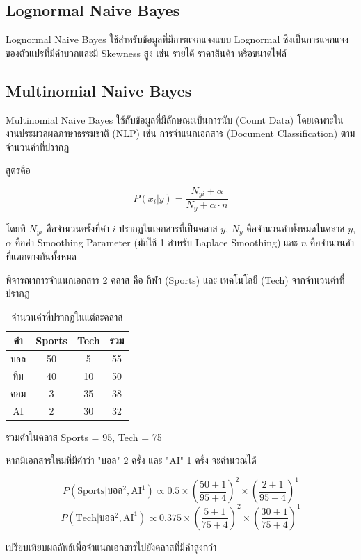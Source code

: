 \subsection{Lognormal Naive Bayes}
Lognormal Naive Bayes ใช้สำหรับข้อมูลที่มีการแจกแจงแบบ Lognormal ซึ่งเป็นการแจกแจงของตัวแปรที่มีค่าบวกและมี Skewness สูง เช่น รายได้ ราคาสินค้า หรือขนาดไฟล์

\subsection{Multinomial Naive Bayes}
Multinomial Naive Bayes ใช้กับข้อมูลที่มีลักษณะเป็นการนับ (Count Data) โดยเฉพาะในงานประมวลผลภาษาธรรมชาติ (NLP) เช่น การจำแนกเอกสาร (Document Classification) ตามจำนวนคำที่ปรากฏ

สูตรคือ

\[
P(x_i | y) = \frac{N_{yi} + \alpha}{N_y + \alpha \cdot n}
\]

โดยที่ $N_{yi}$ คือจำนวนครั้งที่คำ $i$ ปรากฏในเอกสารที่เป็นคลาส $y$, $N_y$ คือจำนวนคำทั้งหมดในคลาส $y$, $\alpha$ คือค่า Smoothing Parameter (มักใช้ 1 สำหรับ Laplace Smoothing) และ $n$ คือจำนวนคำที่แตกต่างกันทั้งหมด

\begin{exmp}
\label{exmp:multinomial_naive_bayes}
พิจารณาการจำแนกเอกสาร 2 คลาส คือ กีฬา (Sports) และ เทคโนโลยี (Tech) จากจำนวนคำที่ปรากฏ

\begin{table}[h!]
\centering
\caption{จำนวนคำที่ปรากฏในแต่ละคลาส}
\label{tab:word_counts}
\begin{tabular}{|c|c|c|c|}
\hline
\textbf{คำ} & \textbf{Sports} & \textbf{Tech} & \textbf{รวม} \\ \hline
บอล & 50 & 5 & 55 \\ \hline
ทีม & 40 & 10 & 50 \\ \hline
คอม & 3 & 35 & 38 \\ \hline
AI & 2 & 30 & 32 \\ \hline
\end{tabular}
\end{table}

รวมคำในคลาส Sports = 95, Tech = 75

หากมีเอกสารใหม่ที่มีคำว่า "บอล" 2 ครั้ง และ "AI" 1 ครั้ง จะคำนวณได้

\[
P(\text{Sports}|\text{บอล}^2, \text{AI}^1) \propto 0.5 \times \left(\frac{50+1}{95+4}\right)^2 \times \left(\frac{2+1}{95+4}\right)^1
\]
\[
P(\text{Tech}|\text{บอล}^2, \text{AI}^1) \propto 0.375 \times \left(\frac{5+1}{75+4}\right)^2 \times \left(\frac{30+1}{75+4}\right)^1
\]

เปรียบเทียบผลลัพธ์เพื่อจำแนกเอกสารไปยังคลาสที่มีค่าสูงกว่า
\end{exmp}





\newpage
